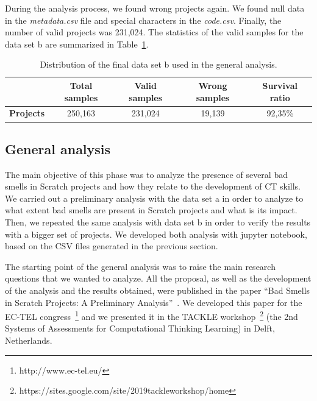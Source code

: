 During the analysis process, we found wrong projects again. We found null data in the \textit{metadata.csv} file and special characters in the \textit{code.csv}. Finally, the number of valid projects was 231,024. The statistics of the valid samples for the data set b are summarized in Table~\ref{table:datacollection_b}.

\begin{table}
 \begin{center}
  \begin{tabular}{|c|c|c|c|c|}
    \hline
     & \textbf{Total samples} & \textbf{Valid samples} & \textbf{Wrong samples} & \textbf{Survival ratio} \\ \hline
    \textbf{Projects} & 250,163 & 231,024 & 19,139 & 92,35\% \\ \hline
  \end{tabular}
  \caption{Distribution of the final data set b used in the general analysis.}
  \label{table:datacollection_b}
 \end{center}
\end{table}
    

\subsection{General analysis}
\label{subsec:generalanalysis}

The main objective of this phase was to analyze the presence of several bad smells in Scratch projects and how they relate to the development of CT skills. We carried out a preliminary analysis with the data set a in order to analyze to what extent bad smells are present in Scratch projects and what is its impact. Then, we repeated the same analysis with data set b in order to verify the results with a bigger set of projects. We developed both analysis with jupyter notebook, based on the CSV files generated in the previous section. 

The starting point of the general analysis was to raise the main research questions that we wanted to analyze. All the proposal, as well as the development of the analysis and the results obtained, were published in the paper ``Bad Smells in Scratch Projects: A Preliminary Analysis''~\cite{vargas2019bad}. We developed this paper for the EC-TEL congress~\footnote{http://www.ec-tel.eu/} and we presented it in the TACKLE workshop~\footnote{https://sites.google.com/site/2019tackleworkshop/home} (the 2nd Systems of Assessments for Computational Thinking Learning) in Delft, Netherlands.

